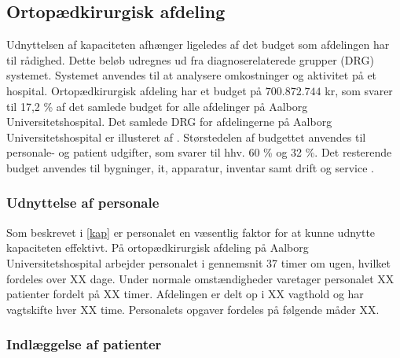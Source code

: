 \subsection{Ortopædkirurgisk afdeling}
Udnyttelsen af kapaciteten afhænger ligeledes af det budget som afdelingen har til rådighed. Dette beløb udregnes ud fra diagnoserelaterede grupper (DRG) systemet. Systemet anvendes til at analysere omkostninger og aktivitet på et hospital.\cite{DRG2016} Ortopædkirurgisk afdeling har et budget på $700.872.744$ kr, som svarer til 17,2 \% af det samlede budget for alle afdelinger på Aalborg Universitetshospital. Det samlede DRG for afdelingerne på Aalborg Universitetshospital er illusteret af .\cite{Rasmussen2016}
Størstedelen af budgettet anvendes til personale- og patient udgifter, som svarer til hhv. 60 \% og 32 \%. Det resterende budget anvendes til bygninger, it, apparatur, inventar samt drift og service \cite{Nøgletal2016}. 




\subsubsection{Udnyttelse af personale} 

Som beskrevet i \ref{kap} er personalet en væsentlig faktor for at kunne udnytte kapaciteten effektivt. På ortopædkirurgisk afdeling på Aalborg Universitetshospital arbejder personalet i gennemsnit 37 timer om ugen, hvilket fordeles over XX dage. \cite{Danske2015} Under normale omstændigheder varetager personalet XX patienter fordelt på XX timer. Afdelingen er delt op i XX vagthold og har vagtskifte hver XX time. Personalets opgaver fordeles på følgende måder XX. 

\subsubsection{Indlæggelse af patienter}

